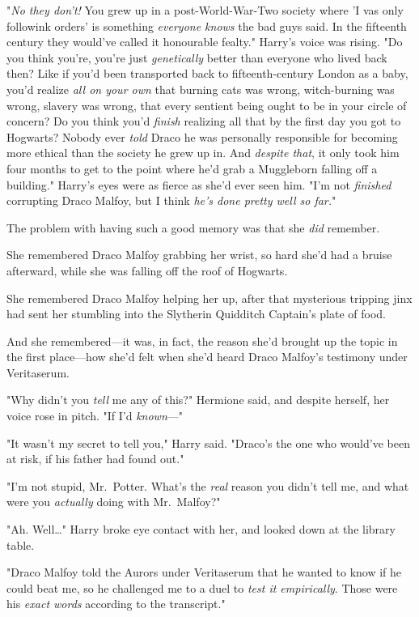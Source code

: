 "\emph{No they don't!} You grew up in a post-World-War-Two society where 'I vas 
only followink orders' is something \emph{everyone knows} the bad guys said. In 
the fifteenth century they would've called it honourable fealty." Harry's voice 
was rising. "Do you think you're, you're just \emph{genetically} better than 
everyone who lived back then? Like if you'd been transported back to 
fifteenth-century London as a baby, you'd realize \emph{all on your own} that 
burning cats was wrong, witch-burning was wrong, slavery was wrong, that every 
sentient being ought to be in your circle of concern? Do you think you'd 
\emph{finish} realizing all that by the first day you got to Hogwarts? Nobody 
ever \emph{told} Draco he was personally responsible for becoming more ethical 
than the society he grew up in. And \emph{despite that}, it only took him four 
months to get to the point where he'd grab a Muggleborn falling off a 
building." Harry's eyes were as fierce as she'd ever seen him. "I'm not 
\emph{finished} corrupting Draco Malfoy, but I think \emph{he's done pretty 
well so far.}"

The problem with having such a good memory was that she \emph{did} remember.

She remembered Draco Malfoy grabbing her wrist, so hard she'd had a bruise 
afterward, while she was falling off the roof of Hogwarts.

She remembered Draco Malfoy helping her up, after that mysterious tripping jinx 
had sent her stumbling into the Slytherin Quidditch Captain's plate of food.

And she remembered---it was, in fact, the reason she'd brought up the topic in 
the first place---how she'd felt when she'd heard Draco Malfoy's testimony 
under Veritaserum.

"Why didn't you \emph{tell} me any of this?" Hermione said, and despite 
herself, her voice rose in pitch. "If I'd \emph{known}---"

"It wasn't my secret to tell you," Harry said. "Draco's the one who would've 
been at risk, if his father had found out."

"I'm not stupid, Mr.~Potter. What's the \emph{real} reason you didn't tell me, 
and what were you \emph{actually} doing with Mr.~Malfoy?"

"Ah. Well{\ldots}" Harry broke eye contact with her, and looked down at the 
library table.

"Draco Malfoy told the Aurors under Veritaserum that he wanted to know if he 
could beat me, so he challenged me to a duel to \emph{test it empirically}. 
Those were his \emph{exact words} according to the transcript."


